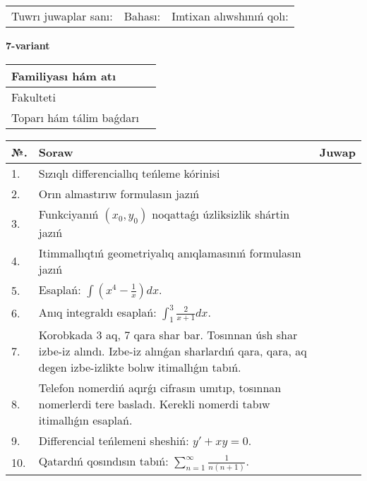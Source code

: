 \documentclass{article}
\begin{document}
\vspace{1cm}

\begin{tabular}{ c c c }
Tuwrı juwaplar sanı: \underline{\hspace{2cm}} & Bahası: \underline{\hspace{2cm}} & Imtixan alıwshınıń qolı: \underline{\hspace{2cm}} \\
\end{tabular}

\newpage

\begin{center}\textbf{7-variant}\end{center}

\bgroup
\def\arraystretch{1.5}
\begin{tabular}{ |m{6cm}|m{10cm}| }
  \hline
  Familiyası hám atı & \\
  \hline
  Fakulteti &\\
  \hline
  Toparı hám tálim baǵdarı & \\
  \hline
\end{tabular}
\egroup

\vspace{0.5cm}

\bgroup
\def\arraystretch{2}
\begin{tabular}{ |l|m{8cm}|m{7cm}| }
  \hline
  №. & Soraw & Juwap \\
  \hline
  1. & Sızıqlı differenciallıq teńleme kórinisi &  \\
  \hline
  2. & Orın almastırıw formulasın jazıń &  \\
  \hline
  3. & Funkciyanıń $(x_{0}, y_{0})$ noqattaǵı úzliksizlik shártin jazıń &  \\
  \hline
  4. & Itimmallıqtıń geometriyalıq anıqlamasınıń formulasın jazıń &  \\
  \hline
  5. & Esaplań: $\displaystyle\int \left( x^{4}-\frac{1}{x} \right)dx$. &  \\
  \hline
  6. & Anıq integraldı esaplań: $\displaystyle\int_{1}^{3}{\frac{2}{x + 1}dx}$. &  \\
  \hline
  7. & Korobkada 3 aq, 7 qara shar bar. Tosınnan úsh shar izbe-iz alındı. Izbe-iz alınǵan sharlardıń qara, qara, aq degen izbe-izlikte bolıw itimallıǵın tabıń. &  \\
  \hline
  8. & Telefon nomerdiń aqırǵı cifrasın umıtıp, tosınnan nomerlerdi tere basladı. Kerekli nomerdi tabıw itimallıǵın esaplań. &  \\
  \hline
  9. & Differencial teńlemeni sheshiń: $y' + xy = 0$. &  \\
  \hline
  10. & Qatardıń qosındısın tabıń: $\displaystyle\sum_{n = 1}^{\infty}\frac{1}{n(n + 1)}$. &  \\
  \hline
\end{tabular}
\egroup
\end{document}
